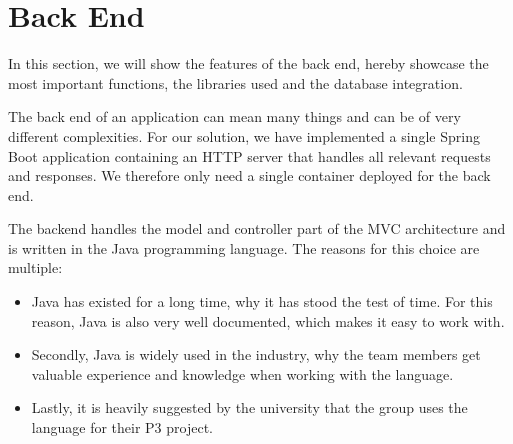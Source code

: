 \section{Back End}\label{sec:back-end}

In this section, we will show the features of the back end, hereby showcase the most important functions,
the libraries used and the database integration.

The back end of an application can mean many things and can be of very different complexities.
For our solution, we have implemented a single Spring Boot application containing an HTTP server that handles all
relevant requests and responses.
We therefore only need a single container deployed for the back end.

The backend handles the model and controller part of the MVC architecture and is written in the Java programming
language.
The reasons for this choice are multiple:

\begin{itemize}
    \item Java has existed for a long time, why it has stood the test of time.
    For this reason, Java is also very well documented, which makes it easy to work with.

    \item Secondly, Java is widely used in the industry, why the team members get valuable experience and knowledge when
    working with the language.

    \item Lastly, it is heavily suggested by the university that the group uses the language for their P3 project.
\end{itemize}





